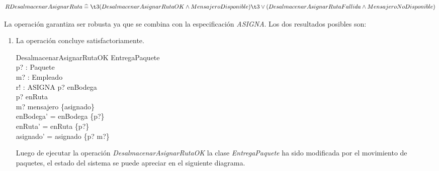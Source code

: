 \documentclass[12pt,a4paper]{article}
\renewcommand*{\defs}{\mathrel{\widehat{=}}}
\begin{document}
\[ RDesalmacenarAsignarRuta \defs\\ 
\t3 (DesalmacenarAsignarRutaOK \wedge MensajeroDisponible)\\ 
\t3 \lor (DesalmacenarAsignarRutaFallida \wedge MensajeroNoDisponible) \]

La operación garantiza ser robusta ya que se combina con la especificación \textit{ASIGNA}. Los dos resultados posibles son:
\begin{enumerate}
\item La operación concluye satisfactoriamente.

\begin{schema}{DesalmacenarAsignarRutaOK}
\Delta EntregaPaquete\\
p? : Paquete\\
m? : Empleado\\
r! : ASIGNA
\where
p? \in enBodega\\
p? \notin  enRuta\\
m? \in mensajero \setminus \{\ran asignado\}\\
enBodega' = enBodega \setminus \{p?\}\\
enRuta' = enRuta \cup \{p?\}\\
asignado' = asignado \cup \{p? \mapsto m?\}
\end{schema}

Luego de ejecutar la operación \textit{DesalmacenarAsignarRutaOK} la clase \textit{EntregaPaquete} ha sido modificada por el movimiento de paquetes, el estado del sistema se puede apreciar en el siguiente diagrama.

\begin{figure}[h]
\centering
{}
\end{figure}
\end{enumerate}
\end{document}
